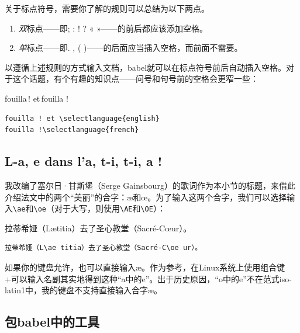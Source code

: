 关于标点符号，需要你了解的规则可以总结为以下两点。

\begin{enumerate}
    \item \emph{双}标点——即; : ! ? « »——的前后都应该添加空格。
    \item \emph{单}标点——即. , ( )——的后面应当插入空格，而前面不需要。
\end{enumerate}

以遵循上述规则的方式输入文档，\textsf{babel}就可以在标点符号前后自动插入空格。对于这个话题，有个有趣的知识点——问号和句号前的空格会更窄一些：

\begin{codelist}[7.1]{
    fouilla\,! et\enspace\,fouilla !
}
\begin{verbatim}
fouilla ! et \selectlanguage{english}
fouilla !\selectlanguage{french}\end{verbatim}
\end{codelist}

\subsection{L-a, e dans l'a, t-i, t-i, a !}

我改编了塞尔日·甘斯堡（Serge Gainsbourg）的歌词作为本小节的标题，来借此介绍法文中的两个“美丽”的合字：æ和œ。为了输入这两个合字，我们可以选择输入\verb|\ae|和\verb+\oe+（对于大写，则使用\verb|\AE|和\verb+\OE+）：

\begin{codelist}[7.2]{
    拉蒂希娅（L\ae titia）去了圣心教堂（Sacré-C\oe ur）。
}
\begin{verbatim}
拉蒂希娅（L\ae titia）去了圣心教堂（Sacré-C\oe ur）。\end{verbatim}
\end{codelist}

如果你的键盘允许，也可以直接输入æ。作为参考，在Linux系统上使用组合键+可以输入名副其实地得到这种“a中的e”。出于历史原因，“o中的e”不在范式iso-latin1中，我的键盘不支持直接输入合字æ。

\subsection{包\textsf{babel}中的工具}


